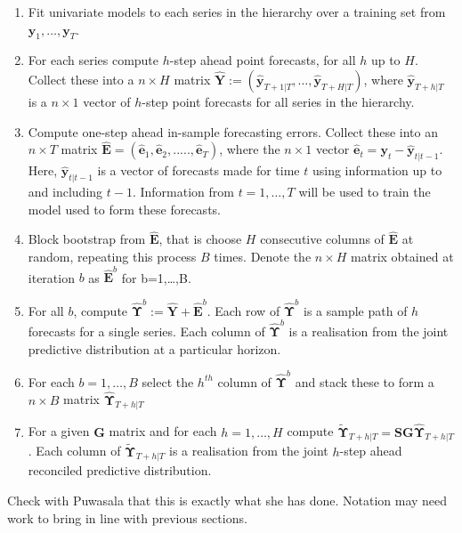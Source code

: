 \documentclass[graybox]{svmult}
\begin{document}
\begin{enumerate}
	\item Fit univariate models to each series in the hierarchy over a training set from ${\bm y}_1,\ldots,{\bm y}_T$.
	\item For each series compute $h$-step ahead point forecasts, for all $h$ up to $H$. Collect these into a $n\times H$ matrix $\hat{\bm Y}:=(\hat{\bm{y}}_{T+1|T},\ldots,\hat{\bm{y}}_{T+H|T})$, where $\hat{\bm{y}}_{T+h|T}$ is a $n\times 1$ vector of $h$-step point forecasts for all series in the hierarchy.
	\item Compute one-step ahead in-sample forecasting errors. Collect these into an $n \times T$ matrix ${\hat{\bm E}}=(\hat{\bm{e}}_1,\hat{\bm{e}}_2,.....,\hat{\bm{e}}_T)$, where the $n\times 1$ vector $\hat{\bm{e}}_t={\bm y}_t-\hat{\bm {y}}_{t|t-1}$.  Here, $\hat{\bm {y}}_{t|t-1}$ is a vector of forecasts made for time $t$ using information up to and including $t-1$. Information from $t=1,\dots,T$ will be used to train the model used to form these forecasts.
	\item Block bootstrap from $\hat{\bm{E}}$, that is choose $H$ consecutive columns of $\hat{{\bm E}}$ at random, repeating this process $B$ times.  Denote the $n\times H$ matrix obtained at iteration $b$ as $\hat{{\bm E}}^b$ for b=1,\ldots,B.
	\item For all $b$, compute $\hat{\bm \Upsilon}^b:=\hat{\bm Y}+{\bm \hat{E}}^b$. Each row of $\hat{\bm \Upsilon}^b$ is a sample path of $h$ forecasts for a single series.  Each column of $\hat{\bm \Upsilon}^b$ is a realisation from the joint predictive distribution at a particular horizon.
	\item For each $b=1,\ldots,B$ select the $h^{th}$ column of $\hat{\bm \Upsilon}^b$ and stack these to form a $n\times B$ matrix $\hat{\bm{\Upsilon}}_{T+h|T}$
	\item For a given ${\bm G}$ matrix and for each $h=1,\ldots,H$ compute $\tilde{\bm{\Upsilon}}_{T+h|T}={\bm S}{\bm G}\hat{\bm{\Upsilon}}_{T+h|T}$.   Each column of $\tilde{\bm \Upsilon}_{T+h|T}$ is a realisation from the joint $h$-step ahead reconciled predictive distribution.
\end{enumerate}


{\color{red}Check with Puwasala that this is exactly what she has done.  Notation may need work to bring in line with previous sections.}

\end{document}
